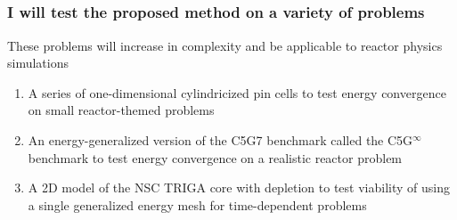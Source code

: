 \documentclass[compress,10pt]{beamer}
\begin{document}
\subsection{}

\typeout{***********************************************************************************}

\begin{frame}
    \frametitle{I will test the proposed method on a variety of problems}

    \centering
    \begin{block}{These problems will increase in complexity and be applicable to reactor physics simulations}
        \begin{enumerate}
            \item<1-> A series of one-dimensional cylindricized pin cells to test energy convergence on small reactor-themed problems
            \item<2-> An energy-generalized version of the C5G7 benchmark called the C5G$^\infty$ benchmark to test energy convergence on a realistic reactor problem
            \item<3-> A 2D model of the NSC TRIGA core with depletion to test viability of using a single generalized energy mesh for time-dependent problems
        \end{enumerate}
    \end{block}

    \begin{columns}
        \centering

        \centering

        \centering
    \end{columns}

\end{frame}
\end{document}
